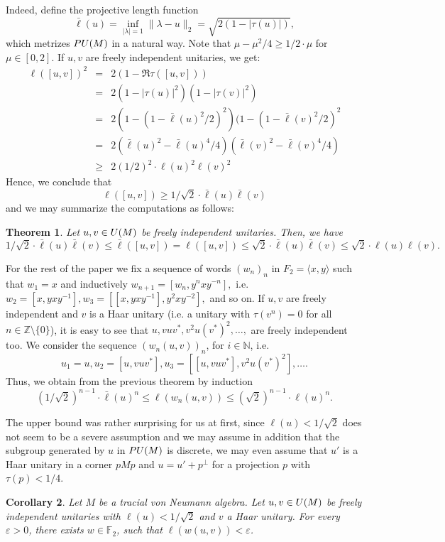 \documentclass[11pt]{amsproc}
\theoremstyle{plain}
\newtheorem{theorem}{Theorem}[section]
\newtheorem{corollary}[theorem]{Corollary}
\theoremstyle{remark}
\begin{document}
Indeed, define the projective length function $$\bar \ell(u) = \inf_{|\lambda|=1 } \|\lambda - u\|_2 = \sqrt{2(1-|\tau(u)|)},$$ which metrizes ${\rm PU}(M)$ in a natural way. Note that
$\mu - \mu^2/4 \geq 1/2 \cdot \mu$ for $\mu \in [0,2]$. If $u,v$ are freely independent unitaries, we get:
\begin{eqnarray*}
\ell([u,v])^2 &=& 2(1 - \Re \tau([u,v])) \\
&=& 2 (1-|\tau(u)|^2)(1- |\tau(v)|^2) \\
&=& 2 (1-(1-\bar\ell(u)^2/2)^2) (1-(1-\bar\ell(v)^2/2)^2 \\
&=& 2 (  \bar \ell(u)^2 - \bar \ell(u)^4/4) ( \bar \ell(v)^2 - \bar \ell(v)^4/4) \\
&\geq& 2 (1/2)^2 \cdot \ell(u)^2 \ell(v)^2
\end{eqnarray*}
Hence, we conclude that
$$\ell([u,v]) \geq 1/\sqrt{2} \cdot \bar \ell(u) \bar \ell(v)$$
and we may summarize the computations as follows:
\begin{theorem}
Let $u,v \in {\rm U}(M)$ be freely independent unitaries. Then, we have
$$1/\sqrt{2} \cdot \bar \ell(u) \bar \ell(v) \leq \bar\ell([u,v])= \ell([u,v]) \leq \sqrt{2} \cdot \bar \ell(u) \bar \ell(v) \leq \sqrt{2} \cdot \ell(u) \ell(v).$$
\end{theorem}

For the rest of the paper we fix a sequence of words $(w_n)_n$ in $F_2= \langle x,y \rangle$ such that $w_1=x$ and inductively $w_{n+1} = [w_n,y^{n}xy^{-n}],$ i.e.\ $w_2=[x,yxy^{-1}], w_3=[[x,yxy^{-1}],y^2xy^{-2}],$ and so on. If $u,v$ are freely independent and $v$ is a Haar unitary (i.e. a unitary with $\tau(v^n)=0$ for all $n \in \mathbb Z \setminus \{0\}$), it is easy to see that $ u,vuv^*,v^2u(v^*)^2,\dots,$ are freely independent too. We consider the sequence $(w_n(u,v))_n$, for $i \in \mathbb N$, i.e.
$$u_1=u, u_2=[u,vuv^*], u_3=\left[[u,vuv^*],v^2u(v^*)^2 \right], \dots.$$
Thus, we obtain from the previous theorem by induction
$$(1/\sqrt{2})^{n-1} \cdot \bar\ell(u)^n \leq \ell(w_n(u,v)) \leq (\sqrt{2})^{n-1} \cdot \ell(u)^n.$$

The upper bound was rather surprising for us at first, since $\ell(u)< 1/\sqrt{2}$ does not seem to be a severe assumption and we may assume in addition that the subgroup generated by $u$ in ${\rm PU}(M)$ is discrete, we may even assume that $u'$ is a Haar unitary in a corner $pMp$ and $u = u' + p^{\perp}$ for a projection $p$ with $\tau(p)<1/4$.

\begin{corollary} Let $M$ be a tracial von Neumann algebra. Let $u,v \in {\rm U}(M)$ be freely independent unitaries with $\ell(u)<1/\sqrt{2}$ and $v$ a Haar unitary. For every $\varepsilon>0$, there exists $w \in \mathbb F_2$, such that $\ell(w(u,v))< \varepsilon$.
\end{corollary}
\end{document}
